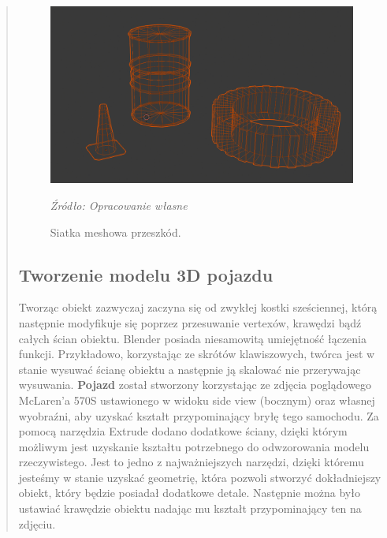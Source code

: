 \begin{quotation}
\begin{figure}[!hbt]
\centering
  \includegraphics[width=1\linewidth]{wireframe.png}
  \caption{Siatka meshowa przeszkód.}\label{rys_9}
  \begin{minipage}[t]{0.75\linewidth}
    \emph{Źródło: Opracowanie własne}
  \end{minipage}
\end{figure}

\newpage
\subsection{Tworzenie modelu 3D pojazdu}
\indent Tworząc obiekt zazwyczaj zaczyna się od zwykłej kostki sześciennej, którą następnie modyfikuje się poprzez przesuwanie vertexów, krawędzi bądź całych ścian obiektu. Blender posiada niesamowitą umiejętność łączenia funkcji. Przykładowo, korzystając ze skrótów klawiszowych, twórca jest w stanie wysuwać ścianę obiektu a następnie ją skalować nie przerywając wysuwania. \textbf{Pojazd} został stworzony korzystając ze zdjęcia poglądowego McLaren'a 570S ustawionego w widoku side view (bocznym) oraz własnej wyobraźni, aby uzyskać kształt przypominający bryłę tego samochodu. Za pomocą narzędzia Extrude dodano dodatkowe ściany, dzięki którym możliwym jest uzyskanie kształtu potrzebnego do odwzorowania modelu rzeczywistego. Jest to jedno z najważniejszych narzędzi, dzięki któremu jesteśmy w stanie uzyskać geometrię, która pozwoli stworzyć dokładniejszy obiekt, który będzie posiadał dodatkowe detale. Następnie można było ustawiać krawędzie obiektu nadając mu kształt przypominający ten na zdjęciu.


\end{quotation}
